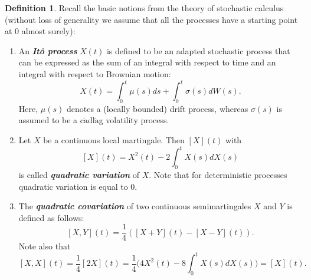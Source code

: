 \documentclass[a4paper,11pt]{book}
\theoremstyle{plain}
\theoremstyle{definition}
\newtheorem{defn}[thm]{Definition}
\newcommand{\define}[1]{\textit{\textbf{#1}}}
\begin{document}
	\begin{defn} \label{stoch calc notions}
		Recall the basic notions from the theory of stochastic calculus (without loss of generality we assume that all the processes have a starting point at $0$ almost surely):
		\begin{enumerate}
			\item An \define{Itô process} $X(t)$ is defined to be an adapted stochastic process that can be expressed as the sum of an integral with respect to time and an integral with respect to Brownian motion:
			\[ X(t) = \int_{0}^{t} \mu(s) ds + \int_{0}^{t} \sigma(s) dW(s). \]
			Here, $\mu(s)$ denotes a (locally bounded) drift process, whereas $\sigma(s)$ is assumed to be a c$\grave{\text{a}}$dl$\grave{\text{a}}$g volatility process.
			\item Let $X$ be a continuous local martingale. Then $[X](t)$ with
			\[ [X](t) = X^2(t) - 2 \int_0^t X(s)dX(s) \]
			is called \define{quadratic variation} of $X$. Note that for deterministic processes quadratic variation is equal to $0$.
			\item The \define{quadratic covariation} of two continuous semimartingales $X$ and $Y$ is defined as follows:
			\[ [X, Y](t) = \frac{1}{4}([X + Y](t) - [X-Y](t)). \] 
			Note also that
			\[ [X, X](t) = \frac{1}{4}[2X](t) = \frac{1}{4} \big(4X^2(t)-8\int_{0}^{t}X(s)dX(s)\big) = [X](t). \]
		\end{enumerate}
	\end{defn}
	
\end{document}
